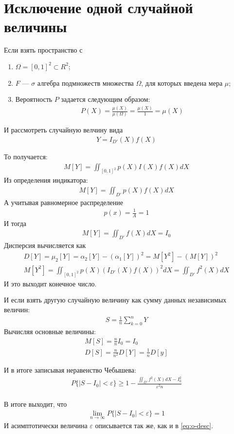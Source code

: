 \section{Исключение одной случайной величины}
Если взять пространство с
\begin{enumerate}
	\item \(\Omega = [0,1]^2 \subset R^2\);
	\item \(F\) --- \(\sigma\) алгебра подмножеств множества \(\Omega\), для которых введена мера \(\mu\);
	\item Вероятность \(P\) задается следующим образом:
	      \begin{align*}
		      P(X) = \frac{\mu(X)}{\mu(\Omega)} = \frac{\mu(X)}{1} = \mu(X)
	      \end{align*}
\end{enumerate}

И рассмотреть случайную велчину вида
\begin{align}
	Y = I_{D'}(X)f(X)
\end{align}

То получается:
\begin{align}
	M[Y] = \iint_{[0,1]^2} p(X) I(X) f(X) dX
\end{align}
Из определения индикатора:
\begin{align}
	M[Y] = \iint_{D'} p(X)f(X) dX
\end{align}
А учитывая равномерное распределение
\begin{align}
	p(x) = \frac{1}{A} = 1
\end{align}
И тогда
\begin{align}
	M[Y] = \iint_{D'} f(X) dX = I_0
\end{align}
Дисперсия вычисляется как
\begin{align}
	D[Y] = \mu_2[Y] = \alpha_2[Y] - (\alpha_1[Y])^2 = M[Y^2] - (M[Y])^2 \\
	M[Y^2] = \iint_{[0, 1]^2} p(X)(I_{D'}(X)f(X))^2 dX = \iint_{D'}f^2(X) dX
\end{align}
И это выходит конечное число.

И если взять другую случайную величину как сумму данных независимых величин:
\begin{align}
	S = \frac{1}{n}\sum_{k=0}^n Y
\end{align}
Вычисляя основные величины:
\begin{align}
	M[S] = \frac{n}{n}I_0 = I_0 \\
	D[S] = \frac{n}{n^2} D[Y] = \frac{1}{n} D[y]
\end{align}

И в итоге записывая неравенство Чебышева:
\begin{align}
	P\{|S - I_0|<\varepsilon\} \geq 1 - \frac{\iint_{D'}f^2(X)dX - I_0^2}{\varepsilon^2 n} \\
\end{align}

В итоге выходит, что
\begin{align}
	\lim_{n\to\infty}P\{|S - I_0|<\varepsilon\} = 1
\end{align}
И асимптотически величина \(\varepsilon\) описывается так же, как и в \cref{eq:o-desc}.
